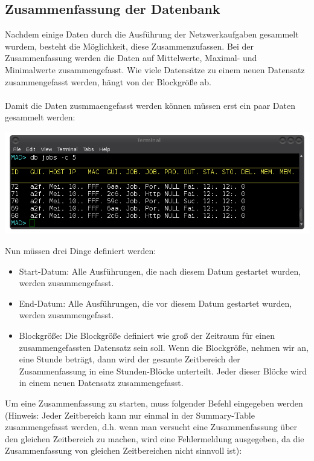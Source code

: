\documentclass[12pt,a4paper]{report}
\begin{document}
\subsection{Zusammenfassung der Datenbank}

Nachdem einige Daten durch die Ausführung der Netzwerkaufgaben gesammelt wurdem, besteht die Möglichkeit, diese Zusammenzufassen. Bei der Zusammenfassung werden die Daten auf Mittelwerte, Maximal- und Minimalwerte zusammengefasst. Wie viele Datensätze zu einem neuen Datensatz zusammengefasst werden, hängt von der Blockgröße ab.\\\\
Damit die Daten zusmmaengefasst werden können müssen erst ein paar Daten gesammelt werden:

\begin{center}
\includegraphics[scale=0.6]{img/db_jobs2.png}
\end{center}

Nun müssen drei Dinge definiert werden:

\begin{itemize}
\item Start-Datum: Alle Ausführungen, die nach diesem Datum gestartet wurden, werden zusammengefasst.
\item End-Datum: Alle Ausführungen, die vor diesem Datum gestartet wurden, werden zusammengefasst.
\item Blockgröße: Die Blockgröße definiert wie groß der Zeitraum für einen zusammengefassten Datensatz sein soll. Wenn die Blockgröße, nehmen wir an, eine Stunde beträgt, dann wird der gesamte Zeitbereich der Zusammenfassung in eine Stunden-Blöcke unterteilt. Jeder dieser Blöcke wird in einem neuen Datensatz zusammengefasst.
\end{itemize}

Um eine Zusammenfassung zu starten, muss folgender Befehl eingegeben werden (Hinweis: Jeder Zeitbereich kann nur einmal in der Summary-Table zusammengefasst werden, d.h. wenn man versucht eine Zusammenfassung über den gleichen Zeitbereich zu machen, wird eine Fehlermeldung ausgegeben, da die Zusammenfassung von gleichen Zeitbereichen nicht sinnvoll ist):\\
\end{document}
